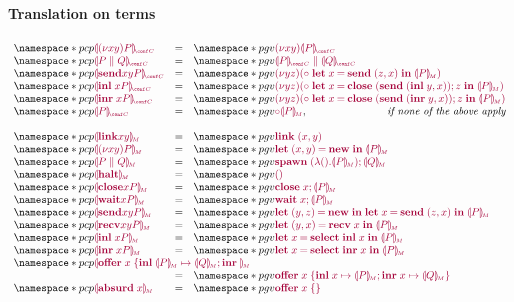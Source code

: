 \documentclass[main.tex]{subfiles}
\begin{document}
\paragraph{Translation on terms}
\[
\begin{array}{lcl}
  \pcp{\tm{\cpgvC{\res{x}{y}{P}}}}
  & = & \pgv{\tm{\res{x}{y}{\cpgvC{P}}}} \\
  \pcp{\tm{\cpgvC{\ppar{P}{Q}}}}
  & = & \pgv{\tm{\ppar{\cpgvC{P}}{\cpgvC{Q}}}} \\
  \pcp{\tm{\cpgvC{\send{x}{y}{P}}}}
  & = & \pgv{\tm{\res{y}{z}{(\child\;\letbind{x}{\send\;\pair{z}{x}}{\cpgvM{P}})}}} \\
  \pcp{\tm{\cpgvC{\inl{x}{P}}}}
  & = & \pgv{\tm{\res{y}{z}{(\child\;\letbind{x}{\andthen{\close\;(\send\;\pair{\inl{y}}{x})}{z}}{\cpgvM{P}})}}} \\
  \pcp{\tm{\cpgvC{\inr{x}{P}}}}
  & = & \pgv{\tm{\res{y}{z}{(\child\;\letbind{x}{\andthen{\close\;(\send\;\pair{\inr{y}}{x})}{z}}{\cpgvM{P}})}}} \\
  \pcp{\tm{\cpgvC{P}}}
  & = & \pgv{\tm{\child{\cpgvM{P}}}},\hfill\textit{if none of the above apply}\\
  \\
  \pcp{\tm{\cpgvM{\link{x}{y}}}}
  & = & \pgv{\tm{\link\;{\pair{x}{y}}}} \\
  \pcp{\tm{\cpgvM{\res{x}{y}{P}}}}
  & = & \pgv{\tm{\letpair{x}{y}{\new}{\cpgvM{P}}}} \\
  \pcp{\tm{\cpgvM{\ppar{P}{Q}}}}
  & = & \pgv{\tm{\andthen{\spawn\;{(\lambda\unit.\cpgvM{P})}}{\cpgvM{Q}}}} \\
  \pcp{\tm{\cpgvM{\halt}}}
  & = & \pgv{\tm{\unit}} \\
  \pcp{\tm{\cpgvM{\close{x}{P}}}}
  & = & \pgv{\tm{\andthen{\close\;{x}}{\cpgvM{P}}}} \\
  \pcp{\tm{\cpgvM{\wait{x}{P}}}}
  & = & \pgv{\tm{\andthen{\wait\;{x}}{\cpgvM{P}}}} \\
  \pcp{\tm{\cpgvM{\send{x}{y}{P}}}}
  & = & \pgv{\tm{\letpair{y}{z}{\new}{\letbind{x}{\send\;{\pair{z}{x}}}{\cpgvM{P}}}}} \\
  \pcp{\tm{\cpgvM{\recv{x}{y}{P}}}}
  & = & \pgv{\tm{\letpair{y}{x}{\recv\;{x}}{\cpgvM{P}}}} \\
  \pcp{\tm{\cpgvM{\inl{x}{P}}}}
  & = & \pgv{\tm{\letbind{x}{\select{\labinl}\;{x}}{\cpgvM{P}}}} \\
  \pcp{\tm{\cpgvM{\inr{x}{P}}}}
  & = & \pgv{\tm{\letbind{x}{\select{\labinr}\;{x}}{\cpgvM{P}}}} \\
  \multicolumn{3}{l}{\pcp{\tm{\cpgvM{\offer{x}{\cpgvM{P}}{\cpgvM{Q}}}}}} \\
  & = & \pgv{\tm{\offer{x}{x}{\cpgvM{P}}{x}{\cpgvM{Q}}}} \\
  \pcp{\tm{\cpgvM{\absurd{x}}}}
  & = & \pgv{\tm{\offeremp{x}}}
\end{array}
\]
\end{document}
